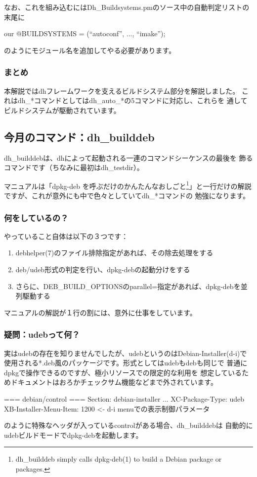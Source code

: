 \documentclass[mingoth,a4paper]{jsarticle}
\begin{document}
なお、これを組み込むにはDh\_Buildsystems.pmのソース中の自動判定リストの
末尾に
\begin{commandline}
our @BUILDSYSTEMS = (``autoconf'', ..., ``imake'');
\end{commandline}
のようにモジュール名を追加してやる必要があります。

\subsubsection{まとめ}
本解説ではdhフレームワークを支えるビルドシステム部分を解説しました。
これはdh\_*コマンドとしてはdh\_auto\_*の5コマンドに対応し、これらを
通してビルドシステムが駆動されています。

\subsection{今月のコマンド：dh\_builddeb}

dh\_builddebは、dhによって起動される一連のコマンドシーケンスの最後を
飾るコマンドです（ちなみに最初はdh\_testdir）。

マニュアルは「dpkg-deb を呼ぶだけのかんたんなおしごと\footnote{
dh\_builddeb simply calls dpkg-deb(1) to build a Debian package or packages.
}」と一行だけの解説ですが、これが意外にも中で色々としていてdh\_*コマンドの
勉強になります。

\subsubsection{何をしているの？}

やっていること自体は以下の３つです：
\begin{enumerate}
\item debhelper(7)のファイル排除指定があれば、その除去処理をする
\item deb/udeb形式の判定を行い、dpkg-debの起動分けをする
\item さらに、DEB\_BUILD\_OPTIONSのparallel=指定があれば、dpkg-debを並列駆動する
\end{enumerate}
マニュアルの解説が１行の割には、意外に仕事をしています。

\subsubsection{疑問：udebって何？}
実はudebの存在を知りませんでしたが、udebというのはDebian-Installer(d-i)で
使用される*.deb風のパッケージです。形式としてはudebもdebも同じで
普通にdpkgで操作できるのですが、極小リソースでの限定的な利用を
想定しているためドキュメントはおろかチェックサム機能などまで外されています。
\begin{commandline}
=== debian/control ===
Section: debian-installer
...
XC-Package-Type: udeb
XB-Installer-Menu-Item: 1200 <- d-i menuでの表示制御パラメータ
\end{commandline}
のように特殊なヘッダが入っているcontrolがある場合、dh\_builddebは
自動的にudebビルドモードでdpkg-debを起動します。
\end{document}
